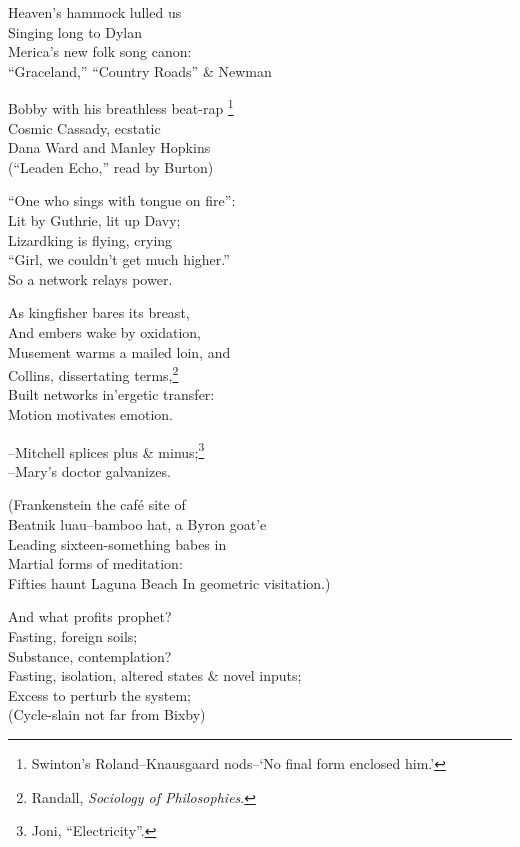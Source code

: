 % 
% 
% 
% 

Heaven's hammock lulled us \\
Singing long to Dylan \\
Merica's new folk song canon: \\
``Graceland,'' ``Country Roads'' \& Newman

Bobby with his breathless beat-rap
\footnote{Swinton's Roland--Knausgaard nods--`No final form enclosed him.'} \\
Cosmic Cassady, ecstatic \\
Dana Ward and Manley Hopkins \\
(``Leaden Echo,'' read by Burton)

``One who sings with tongue on fire'': \\
Lit by Guthrie, lit up Davy;  \\
Lizardking is flying, crying \\
``Girl, we couldn't get much higher.'' \\
So a network relays power.

As kingfisher bares its breast, \\
And embers wake by oxidation, \\
Musement warms a mailed loin, and \\
Collins, dissertating terms,\footnote{Randall, \textit{Sociology of Philosophies}.} \\
Built networks in'ergetic transfer: \\
Motion motivates emotion.

--Mitchell splices plus \& minus;\footnote{Joni, ``Electricity''.} \\
--Mary's doctor galvanizes.

(Frankenstein the café site of \\
Beatnik luau--bamboo hat, a Byron goat'e \\
Leading sixteen-something babes in \\
Martial forms of meditation: \\
Fifties haunt Laguna Beach
In geometric visitation.)

And what profits prophet? \\
Fasting, foreign soils; \\
Substance, contemplation? \\
Fasting, isolation, altered states \& novel inputs; \\
Excess to perturb the system; \\
(Cycle-slain not far from Bixby)

